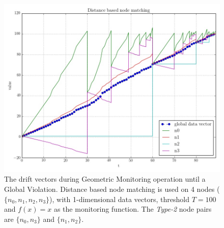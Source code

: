 \begin{figure}
        \centering
		\includegraphics[scale=0.30]{img/distoptpair_example_full.jpeg}
        \caption{The drift vectors during Geometric Monitoring operation until a Global Violation. Distance based node matching is used on 4 nodes ($\{n_0, n_1, n_2, n_3\}$), with 1-dimensional data vectors, threshold $T=100$ and $f(x)=x$ as the monitoring function. The \emph{Type-2} node pairs are $\{n_0, n_3\}$ and $\{n_1, n_2\}$.}\label{fig:distoptpair}
\end{figure}
